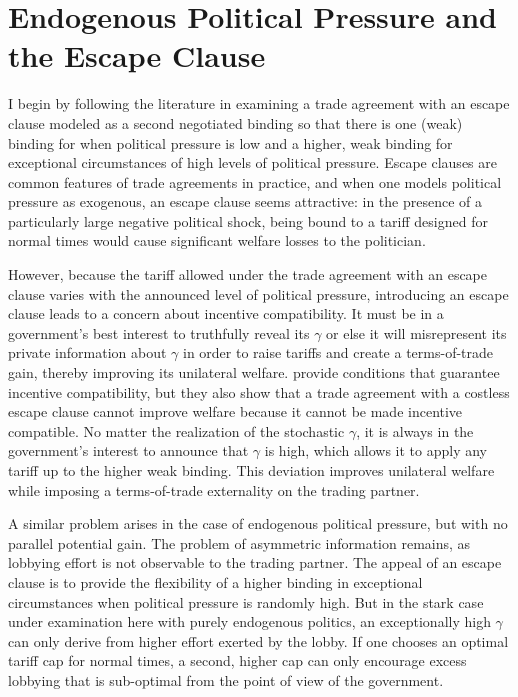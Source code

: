 \documentclass[12pt]{article}
\newcommand{\ga}{\gamma}
\begin{document}
\section{Endogenous Political Pressure and the Escape Clause}
\label{sec:escape}
I begin by following the literature in examining a trade agreement with an escape clause modeled as a second negotiated binding so that there is one (weak) binding for when political pressure is low and a higher, weak binding for exceptional circumstances of high levels of political pressure. Escape clauses are common features of trade agreements in practice, and when one models political pressure as exogenous, an escape clause seems attractive: in the presence of a particularly large negative political shock, being bound to a tariff designed for normal times would cause significant welfare losses to the politician.

However, because the tariff allowed under the trade agreement with an escape clause varies with the announced level of political pressure, introducing an escape clause leads to a concern about incentive compatibility. It must be in a government's best interest to truthfully reveal its $\ga$ or else it will misrepresent its private information about $\ga$ in order to raise tariffs and create a terms-of-trade gain, thereby improving its unilateral welfare. \Textcite{bs2005} provide conditions that guarantee incentive compatibility, but they also show that a trade agreement with a costless escape clause cannot improve welfare because it cannot be made incentive compatible. No matter the realization of the stochastic $\ga$, it is always in the government's interest to announce that $\ga$ is high, which allows it to apply any tariff up to the higher weak binding. This deviation improves unilateral welfare while imposing a terms-of-trade externality on the trading partner.

A similar problem arises in the case of endogenous political pressure, but with no parallel potential gain. The problem of asymmetric information remains, as lobbying effort is not observable to the trading partner. The appeal of an escape clause is to provide the flexibility of a higher binding in exceptional circumstances when political pressure is randomly high. But in the stark case under examination here with purely endogenous politics, an exceptionally high $\ga$ can only derive from higher effort exerted by the lobby. If one chooses an optimal tariff cap for normal times, a second, higher cap can only encourage excess lobbying that is sub-optimal from the point of view of the government.
\end{document}
